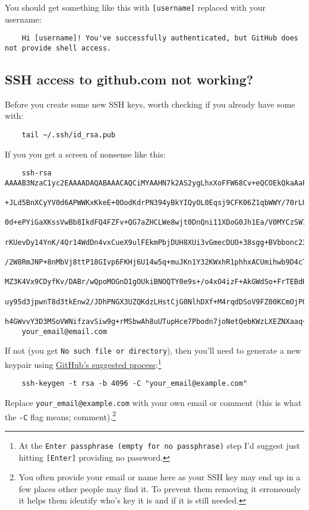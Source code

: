 You should get something like this with \texttt{[username]} replaced with your username:

\begin{verbatim}
    Hi [username]! You've successfully authenticated, but GitHub does not provide shell access.
\end{verbatim}

\subsection{SSH access to github.com not working?}

Before you create some new SSH keys, worth checking if you already have some with:

\begin{verbatim}
    tail ~/.ssh/id_rsa.pub
\end{verbatim}

If you you get a screen of nonsense like this:

\begin{verbatim}
    ssh-rsa AAAAB3NzaC1yc2EAAAADAQABAAACAQCiMYAAHN7k2AS2ygLhxXoFFW68Cv+eQCOEkQkaAaPL7lgZppaoQoQ9Y/k6uky
    +JLd5BnXCyYV0d6APWWKxKkeE+0OodKdrPN394yBkYIQyOL0Eqsj9CFK06Z1qbWWY/70rLUql0W232eoS8Ct6IHX/kw
    0d+ePYiGaXKssVwBb8IkdFQ4FZFv+QG7aZHCLWe8wjt0DnQni11XDoG0Jh1Ea/V0MYCzSW71wmACd56HJmkwM4MB9RS
    rKUevDy14YnK/4Qr14WdDn4vxCueX9ulFEkmPbjDUH8XUi3vGmecDUO+38sgg+BVbbonc23zR+fR9OH6mUPR4+4u3tA
    /2W8RmJNP+8nMbVj8ttP18GIvp6FKHj6U14w5q+muJKn1Y32KWxhR1phhxACUmihwb9D4cTpcDgpC0QsLKshJn8BUom
    MZ3K4Vx9CDyfKv/DABr/wQpoMOGnD1gOUkiBNOQTY0e9s+/o4xO4izF+AkGWdSo+FrTEBdH/v+DLNAJR1gG6DtmW1vf
    uy95d3jpwnT8d3tkEnw2/JDhPNGX3UZQKdzLHstCjG0NlhDXf+M4rqdDSoV9FZ00KCmOjPO4pl4Y93g1WFd3kpyLvqL
    h4GWvvY3D3MSoVWNifzavSiw9g+rMSbwAh8uUTupHce7Pbodn7joNetQebKWzLXEZNXaaq+a75PVQ==
    your_email@email.com
\end{verbatim}

If not (you get \texttt{No such file or directory}), then you'll need to generate a new keypair using \href{https://help.github.com/en/articles/generating-a-new-ssh-key-and-adding-it-to-the-ssh-agent}{GitHub's suggested process}:\footnote{At the \texttt{Enter passphrase (empty for no passphrase)} step I'd suggest just hitting \texttt{[Enter]} providing no password.}

\begin{verbatim}
    ssh-keygen -t rsa -b 4096 -C "your_email@example.com"
\end{verbatim}

Replace \texttt{your\_email@example.com} with your own email or comment (this is what the \texttt{-C} flag means; comment).\footnote{You often provide your email or name here as your SSH key may end up in a few places other people may find it. To prevent them removing it erroneously it helps them identify who's key it is and if it is still needed.}

